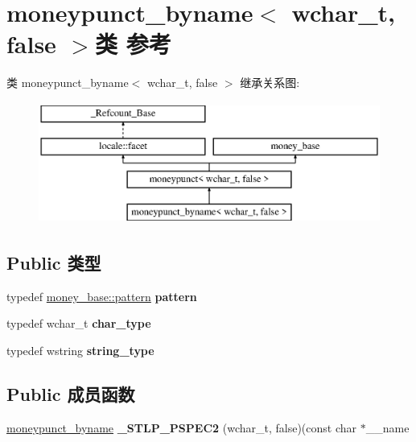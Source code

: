 \hypertarget{classmoneypunct__byname_3_01wchar__t_00_01false_01_4}{}\section{moneypunct\+\_\+byname$<$ wchar\+\_\+t, false $>$类 参考}
\label{classmoneypunct__byname_3_01wchar__t_00_01false_01_4}
类 moneypunct\+\_\+byname$<$ wchar\+\_\+t, false $>$ 继承关系图\+:\begin{figure}[H]
\begin{center}
\leavevmode
\includegraphics[height=4.000000cm]{classmoneypunct__byname_3_01wchar__t_00_01false_01_4}
\end{center}
\end{figure}
\subsection*{Public 类型}
\begin{DoxyCompactItemize}
\item 
\mbox{\label{classmoneypunct__byname_3_01wchar__t_00_01false_01_4_ad78fad6268f99f7cec5afc049aa2f86b}} 
typedef \hyperlink{structmoney__base_1_1pattern}{money\+\_\+base\+::pattern} {\bfseries pattern}
\item 
\mbox{\label{classmoneypunct__byname_3_01wchar__t_00_01false_01_4_addda755e069fb2f149a3d0405cbf913a}} 
typedef wchar\+\_\+t {\bfseries char\+\_\+type}
\item 
\mbox{\label{classmoneypunct__byname_3_01wchar__t_00_01false_01_4_af3b4a1fbc58284a799e40cb638d22069}} 
typedef wstring {\bfseries string\+\_\+type}
\end{DoxyCompactItemize}
\subsection*{Public 成员函数}
\begin{DoxyCompactItemize}
\item 
\mbox{\label{classmoneypunct__byname_3_01wchar__t_00_01false_01_4_a4130bc77862955a46edf377b3026d3cf}} 
\hyperlink{classmoneypunct__byname}{moneypunct\+\_\+byname} {\bfseries \+\_\+\+S\+T\+L\+P\+\_\+\+P\+S\+P\+E\+C2} (wchar\+\_\+t, false)(const char $\ast$\+\_\+\+\_\+name
\end{DoxyCompactItemize}

